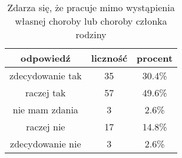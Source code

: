 \begin{table}[H]
\caption{Zdarza się, że pracuje mimo wystąpienia własnej choroby lub choroby członka rodziny}
\centering
\begin{tabular}{ | c | c | c |}
\hline
odpowiedź & liczność & procent\\
\hline
zdecydowanie tak  &  35  & 30.4\% \\
\hline
raczej tak  &  57  & 49.6\% \\
\hline
nie mam zdania  &  3  & 2.6\% \\
\hline
raczej nie  &  17  & 14.8\% \\
\hline
zdecydowanie nie  &  3  & 2.6\% \\
\hline
\end{tabular}
\label{tab:Q31}
\end{table}
